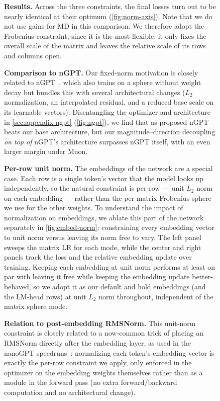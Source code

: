 \documentclass[10pt]{article} %
\makeatletter
\def\subsubsection{\@startsection{subsubsection}{3}{\z@}{-1.3ex plus -0.5ex minus -.2ex}{0.3ex plus .1ex}{\normalsize\bf\raggedright\sffamily}}
\makeatother
\begin{document}
\begin{figure}[t]
\textbf{Results.} Across the three constraints, the final losses turn out to be nearly identical at their optimum (\autoref{fig:norm-axis}). Note that we do not use gains for MD in this comparison. We therefore adopt the Frobenius constraint, since it is the most flexible: it only fixes the overall scale of the matrix and leaves the relative scale of its rows and columns open.

\textbf{Comparison to nGPT.} Our fixed-norm motivation is closely related to nGPT~\citep{loshchilov2024ngpt}, which also trains on a sphere without weight decay but bundles this with several architectural changes ($L_2$ normalization, an interpolated residual, and a reduced base scale on its learnable vectors). Disentangling the optimizer and architecture in \autoref{sec:appendix-ngpt} (\autoref{fig:ngpt}), we find that as proposed nGPT beats our base architecture, but our magnitude--direction decoupling \emph{on top of} nGPT's architecture surpasses nGPT itself, with an even larger margin under Muon.

\subsubsection{Embeddings}
\label{sec:embed-norm}

\textbf{Per-row unit norm.} The embeddings of the network are a special case. Each row is a single token's vector that the model looks up independently, so the natural constraint is per-row --- unit $L_2$ norm on each embedding --- rather than the per-matrix Frobenius sphere we use for the other weights. To understand the impact of normalization on embeddings, we ablate this part of the network separately in \autoref{fig:embed-norm}: constraining every embedding vector to unit norm versus leaving its norm free to vary. The left panel sweeps the matrix LR for each mode, while the center and right panels track the loss and the relative embedding update over training. Keeping each embedding at unit norm performs at least on par with leaving it free while keeping the embedding update better-behaved, so we adopt it as our default and hold embeddings (and the LM-head rows) at unit $L_2$ norm throughout, independent of the matrix sphere mode.

\textbf{Relation to post-embedding RMSNorm.} This unit-norm constraint is closely related to a now-common trick of placing an RMSNorm directly after the embedding layer, as used in the nanoGPT speedruns~\citep{jordan2024nanogpt}: normalizing each token's embedding vector is exactly the per-row constraint we apply, only enforced in the optimizer on the embedding weights themselves rather than as a module in the forward pass (no extra forward/backward computation and no architectural change). 


\end{figure}
\end{document}
